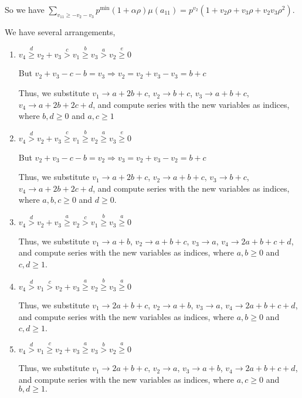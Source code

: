 \documentclass{article}
\begin{document}
So we have $\sum_{v_{11}\geq{-v_2-v_3}}p^{\min}(1+\alpha\rho)\mu(a_{11})=p^{v_2}(1+v_2\rho+v_3\rho+v_2v_3\rho^2).$

We have several arrangements,
\begin{enumerate}
\item 
$v_4\overset{d}{\geq}v_2+v_3\overset{c}{>}v_1\overset{b}{\geq}{v_3}\overset{a}{>}v_2\overset{e}{\geq}{0}$

But $v_2+v_3-c-b=v_3\Rightarrow{v_2=v_2+v_3-v_3=b+c}$

Thus, we substitute 
$v_1\rightarrow{a+2b+c}$, 
$v_2\rightarrow{b+c}$, 
$v_3\rightarrow{a+b+c}$, 
$v_4\rightarrow{a+2b+2c+d}$, and compute series with the new variables as indices, where $b,d\geq{0}$ and $a,c\geq{1}$

\item 
$v_4\overset{d}>v_2+v_3\overset{c}{\geq}v_1\overset{b}{\geq}{v_2}\overset{a}{\geq}v_3\overset{e}{\geq}{0}$

But $v_2+v_3-c-b=v_2\Rightarrow{v_3=v_2+v_3-v_2=b+c}$

Thus, we substitute 
$v_1\rightarrow{a+2b+c}$, 
$v_2\rightarrow{a+b+c}$, 
$v_3\rightarrow{b+c}$, 
$v_4\rightarrow{a+2b+2c+d}$, and compute series with the new variables as indices, where $a,b,c\geq{0}$ and $d\geq{0}$.
\item 
$v_4\overset{d}>v_2+v_3\overset{a}{\geq}v_2\overset{c}{>}{v_1}\overset{b}{\geq}v_3\overset{a}{\geq}{0}$


Thus, we substitute 
$v_1\rightarrow{a+b}$, 
$v_2\rightarrow{a+b+c}$, 
$v_3\rightarrow{a}$, 
$v_4\rightarrow{2a+b+c+d}$, and compute series with the new variables as indices, where $a,b\geq{0}$ and $c,d\geq{1}$.

\item 
$v_4\overset{d}{>}v_1\overset{c}>v_2+v_3\overset{a}{\geq}{v_2}\overset{b}{\geq}v_3\overset{a}{\geq}{0}$

Thus, we substitute 
$v_1\rightarrow{2a+b+c}$, 
$v_2\rightarrow{a+b}$, 
$v_3\rightarrow{a}$, 
$v_4\rightarrow{2a+b+c+d}$, and compute series with the new variables as indices, where $a,b\geq{0}$ and $c,d\geq{1}$.

\item 
$v_4\overset{d}{>}v_1\overset{c}{\geq}v_2+v_3\overset{a}{\geq}{v_3}\overset{b}{>}v_2\overset{a}{\geq}{0}$

Thus, we substitute 
$v_1\rightarrow{2a+b+c}$, 
$v_2\rightarrow{a}$, 
$v_3\rightarrow{a+b}$, 
$v_4\rightarrow{2a+b+c+d}$, and compute series with the new variables as indices, where $a,c\geq{0}$ and $b,d\geq{1}.$

\end{enumerate}
\end{document}
